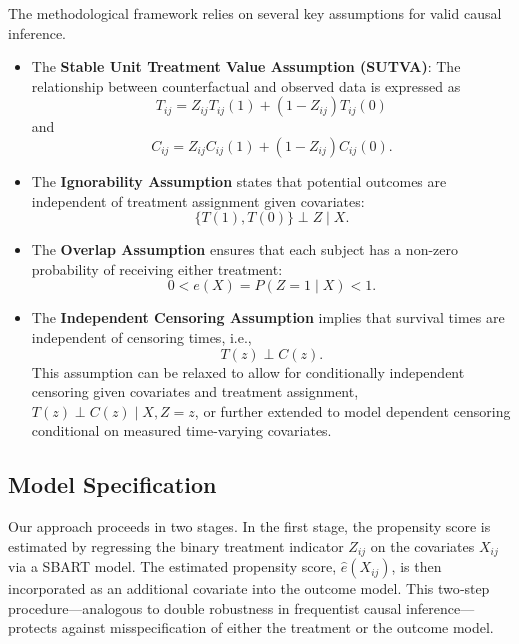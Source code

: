 \documentclass[useAMS,referee]{biom}
\begin{document}
The methodological framework relies on several key assumptions for valid causal inference. 
\begin{itemize}
   \item The \textbf{Stable Unit Treatment Value Assumption (SUTVA)}: The relationship between counterfactual and observed data is expressed as 
   \[
   T_{ij} = Z_{ij} T_{ij}(1) + (1 - Z_{ij}) T_{ij}(0)
   \]
   and 
   \[
   C_{ij} = Z_{ij} C_{ij}(1) + (1 - Z_{ij}) C_{ij}(0).
   \]
   \item The \textbf{Ignorability Assumption} states that potential outcomes are independent of treatment assignment given covariates: 
   \[
   \{T(1), T(0)\} \perp Z \mid X.
   \]
   \item The \textbf{Overlap Assumption} ensures that each subject has a non-zero probability of receiving either treatment: 
   \[
   0 < e(X) = P(Z = 1 \mid X) < 1.
   \]
   \item The \textbf{Independent Censoring Assumption} implies that survival times are independent of censoring times, i.e., 
   \[
   T(z) \perp C(z).
   \]
   This assumption can be relaxed to allow for conditionally independent censoring given covariates and treatment assignment, \( T(z) \perp C(z) \mid X, Z = z \), or further extended to model dependent censoring conditional on measured time-varying covariates.
\end{itemize}  

\subsection{Model Specification}

Our approach proceeds in two stages. In the first stage, the propensity score is estimated by regressing the binary treatment indicator \( Z_{ij} \) on the covariates \( X_{ij} \) via a SBART model. The estimated propensity score, \(\hat{e}(X_{ij})\), is then incorporated as an additional covariate into the outcome model. This two‐step procedure—analogous to double robustness in frequentist causal inference—protects against misspecification of either the treatment or the outcome model.
\end{document}
